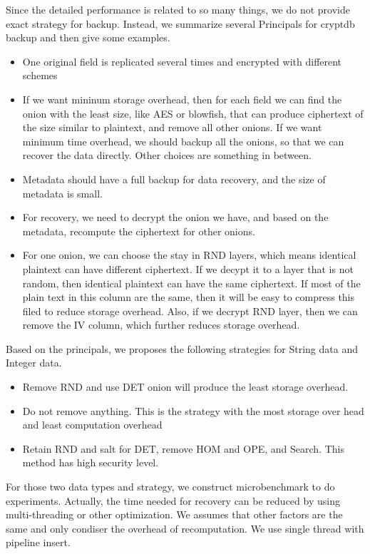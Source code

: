 Since the detailed performance is related to so many things, we do not provide exact strategy for backup. Instead, we summarize several Principals for cryptdb backup and then give some examples. 

\begin{itemize}
\item One original field is replicated several times and encrypted with different schemes
\item If we want mininum storage overhead, then for each field we can find the onion with the least size, like AES or blowfish, that can produce ciphertext of the size similar to plaintext, and remove all other onions. If we want minimum time overhead, we should backup all the onions, so that we can recover the data directly. Other choices are something in between.
\item Metadata should have a full backup for data recovery, and the size of metadata is small. 
\item For recovery, we need to decrypt the onion we have, and based on the metadata, recompute the ciphertext for other onions.
\item For one onion, we can choose the stay in RND layers, which means identical plaintext can have different ciphertext. If we decypt it to a layer that is not random, then identical plaintext can have the same ciphertext. If most of the plain text in this column are the same, then it will be easy to compress this filed to reduce storage overhead. Also, if we decrypt RND layer, then we can remove the IV column, which further reduces storage overhead.
\end{itemize}


Based on the principals, we proposes the following strategies for String data and Integer data. 

\begin{itemize}
\item Remove RND and use DET onion will produce the least storage overhead.
\item Do not remove anything. This is the strategy with the most storage over head and least computation overhead
\item Retain RND and salt for DET, remove HOM and OPE, and Search. This method has high security level.
\end{itemize}




For those two data types and strategy, we construct microbenchmark to do experiments. Actually, the time needed for recovery can be reduced by using multi-threading or other optimization. We assumes that other factors are the same and only condiser the overhead of recomputation. We use single thread with pipeline insert.

